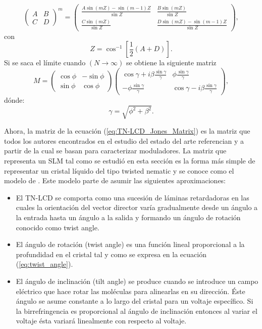 \begin{equation}
  \begin{pmatrix}
    A & B \\ C & D
  \end{pmatrix}^m
=
\begin{pmatrix}
  \frac{A\sin{ (mZ) }-\sin(m-1)Z }{\sin{Z} }
  &\frac{B\sin{(mZ)}}{\sin{Z}}\\
\frac{C\sin{(mZ)}}{\sin{Z}}&   \frac{D\sin{ (mZ) }-\sin(m-1)Z }{\sin{Z} }
\end{pmatrix},
  \label{eq:chebyshev}
\end{equation}
con \[Z = \cos^{-1}{\left[\frac{1}{2}(A+D)\right]}.\]
Si se saca el límite cuando $(N\rightarrow \infty)$ se obtiene la
siguiente matriz
\begin{equation}
  \label{eq:TN-LCD_Jones_Matrix}
  M=
  \begin{pmatrix}
    \cos{\phi} & -\sin{\phi}\\\sin{\phi}&\cos{\phi}
  \end{pmatrix}
  \begin{pmatrix}
    \cos{\gamma}+i\beta\frac{\sin{\gamma}}{\gamma} & \phi\frac{\sin{\gamma}}{\gamma}\\
-\phi\frac{\sin{\gamma}}{\gamma}   & \cos{\gamma}-i\beta\frac{\sin{\gamma}}{\gamma}
  \end{pmatrix},
\end{equation} 
dónde:
\[\gamma=\sqrt{\phi^2+\beta^2}.\]

Ahora, la matriz de la ecuación (\ref{eq:TN-LCD_Jones_Matrix})  es la
matriz que todos los autores encontrados en el
estudio del estado del arte referencian y a partir de la cual se basan
para caracterizar moduladores. La matriz que representa un
SLM  tal como se estudió en esta sección es la forma más
simple de representar un cristal líquido del tipo twisted nematic y se
conoce como el modelo de . Este modelo
parte de asumir las siguientes aproximaciones:

\begin{itemize}
\item El TN-LCD se comporta como una sucesión de  láminas
  retardadoras en las cuales la orientación del vector director varía
  gradualmente desde un ángulo a la entrada hasta un ángulo a la
  salida y formando un ángulo de rotación conocido como twist angle. 
\item El ángulo de rotación (twist angle) es una función lineal
  proporcional a la profundidad en el cristal tal y como se expresa en
  la ecuación (\ref{eq:twist_angle}).
\item El ángulo de inclinación (tilt angle) se produce cuando se
  introduce un campo eléctrico que hace rotar las moléculas para
  alinearlas en su dirección. Éste ángulo se asume constante a lo
  largo del cristal para un voltaje específico. Si la birrefringencia
  es proporcional al ángulo de inclinación entonces al variar el
  voltaje ésta variará linealmente con respecto al voltaje.
\end{itemize}

